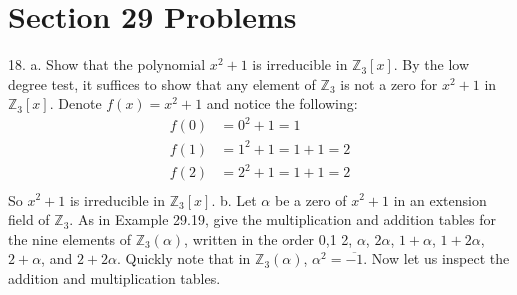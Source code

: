 \documentclass{article}
\begin{document}
\section*{Section 29 Problems}
18. a. Show that the polynomial $x^2 + 1$ is irreducible in $\mathbb{Z}_3[x]$.
\newline\newline
By the low degree test, it suffices to show that any element of $\mathbb{Z}_3$ is not a zero for $x^2 + 1$ in $\mathbb{Z}_3[x]$. Denote $f(x) = x^2 + 1$ and notice the following:
\begin{align*}
    f(0) &= 0^2 + 1 = 1 \\
    f(1) &= 1^2 + 1 = 1 + 1 = 2 \\
    f(2) &= 2^2 + 1 = 1 + 1 = 2 \\
\end{align*}
So $x^2 + 1$ is irreducible in $\mathbb{Z}_3[x]$.
\newline
b. Let $\alpha$ be a zero of $x^2 + 1$ in an extension field of $\mathbb{Z}_3$. As in Example 29.19, give the multiplication and addition tables for the nine elements of $\mathbb{Z}_3(\alpha)$, written in the order 0,1 2, $\alpha$, $2\alpha$, $1 + \alpha$, $1 + 2\alpha$, $2 + \alpha$, and $2 + 2\alpha$.
\newline\newline
Quickly note that in $\mathbb{Z}_3(\alpha)$, $\alpha^2 = \overline{-1}$. Now let us inspect the addition and multiplication tables.
\newline\newline
\end{document}
